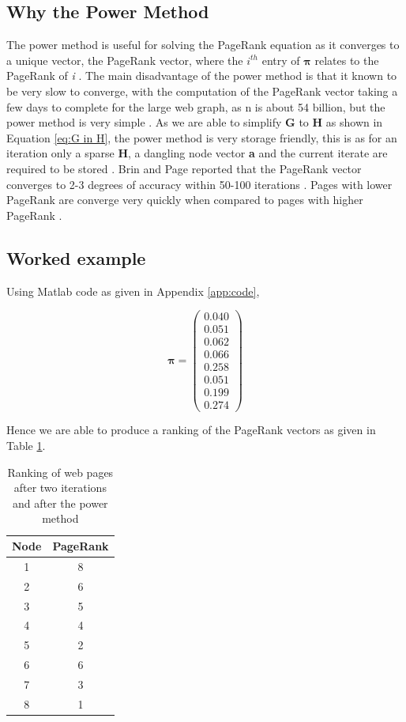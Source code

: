 \documentclass[11pt]{report}
\begin{document}
\subsection{Why the Power Method}\label{sec:why power}

The power method is useful for solving the PageRank equation as it converges to a unique vector, the PageRank vector, where the $i^{th}$ entry of $\boldsymbol\pi$ relates to the PageRank of \textit{i} \cite{ipsen2005analysis}. The main disadvantage of the power method is that it known to be very slow to converge, with the computation of the PageRank vector taking a few days to complete for the large web graph, as n is about 54 billion, but the power method is very simple \cite{bonato}. As we are able to simplify \textbf{G} to \textbf{H} as shown in Equation \eqref{eq:G in H}, the power method is very storage friendly, this is as for an iteration only a sparse \textbf{H}, a dangling node vector \textbf{a} and the current iterate are required to be stored \cite{langville}. Brin and Page reported that the PageRank vector converges to 2-3 degrees of accuracy within 50-100 iterations \cite{austin}. Pages with lower PageRank are converge very quickly when compared to pages with higher PageRank \cite{thorson2004modeling}.

\subsection{Worked example}
Using Matlab code as given in Appendix \ref{app:code}, 

\[\boldsymbol\pi = \left(
\begin{array}{c}
0.040 \\
0.051 \\
0.062 \\
0.066 \\
0.258 \\
0.051 \\
0.199 \\
0.274
\end{array}
\right)\]

Hence we are able to produce a ranking of the PageRank vectors as given in Table \ref{tble:PR}. 
\begin{table}[h] \caption{Ranking of web pages after two iterations and after the power method}
 \centering
 \begin{tabular} {c| c} 
 Node & PageRank \\ [0.5ex] 
 \hline
 1&8\\
 2&6\\
 3&5\\
 4&4\\
 5&2\\
 6&6\\
 7&3\\
 8&1\\
 \end{tabular}
 \label{tble:PR}
\end{table}
\end{document}
